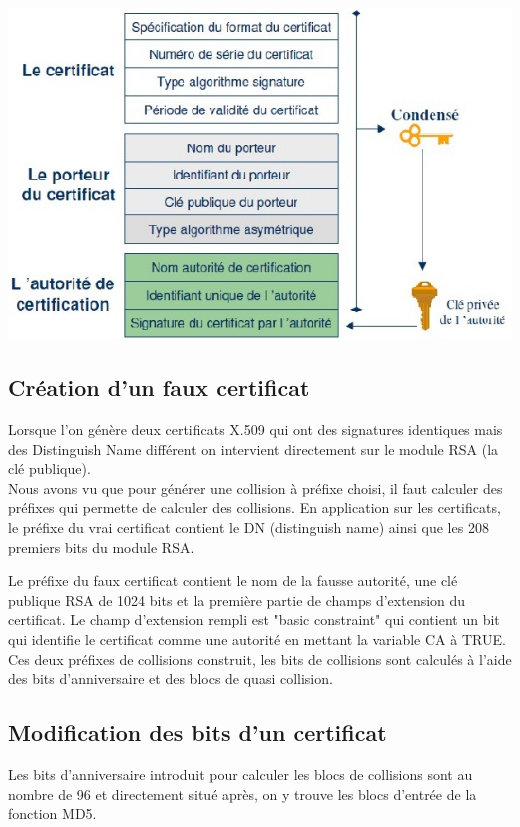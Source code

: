 \documentclass[a4paper,11pt,french]{article}
\begin{document}
\includegraphics[scale=.61]{./pics/cert.jpg}

\subsection{Création d'un faux certificat}
Lorsque l'on génère deux certificats X.509 qui ont des signatures identiques mais des Distinguish Name différent on intervient directement sur le module RSA (la clé publique).\\

Nous avons vu que pour générer une collision à préfixe choisi, il faut calculer des préfixes qui permette de calculer des collisions. En application sur les certificats, le préfixe du vrai certificat contient le DN (distinguish name) ainsi que les 208 premiers bits du module RSA.

Le préfixe du faux certificat contient le nom de la fausse autorité, une clé publique RSA de 1024 bits et la première partie de champs d'extension du certificat. Le champ d'extension rempli est "basic constraint" qui contient un bit qui identifie le certificat comme une autorité en mettant la variable CA à TRUE.\\

Ces deux préfixes de collisions construit, les bits de collisions sont calculés à l'aide des bits d'anniversaire et des blocs de quasi collision.

\subsection{Modification des bits d'un certificat}
Les bits d'anniversaire introduit pour calculer les blocs de collisions sont au nombre de 96 et directement situé après, on y trouve les blocs d'entrée de la fonction MD5.
\end{document}
